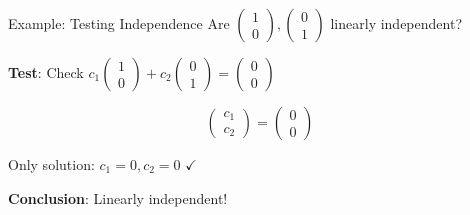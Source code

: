 \documentclass[10pt]{beamer}
\theoremstyle{definition}
\newcommand{\x}[1]{\alert{\textbf{#1}}}
\begin{document}
\begin{frame}{Example: Testing Independence}
Are $\begin{pmatrix} 1 \\ 0 \end{pmatrix}, \begin{pmatrix} 0 \\ 1 \end{pmatrix}$ linearly independent?

\vfill
\textbf{Test}: Check $c_1\begin{pmatrix} 1 \\ 0 \end{pmatrix} + c_2\begin{pmatrix} 0 \\ 1 \end{pmatrix} = \begin{pmatrix} 0 \\ 0 \end{pmatrix}$

$$\begin{pmatrix} c_1 \\ c_2 \end{pmatrix} = \begin{pmatrix} 0 \\ 0 \end{pmatrix}$$

\vfill
Only solution: $c_1 = 0, c_2 = 0$ $\checkmark$

\vfill
\x{Conclusion}: Linearly independent!
\end{frame}
\end{document}
